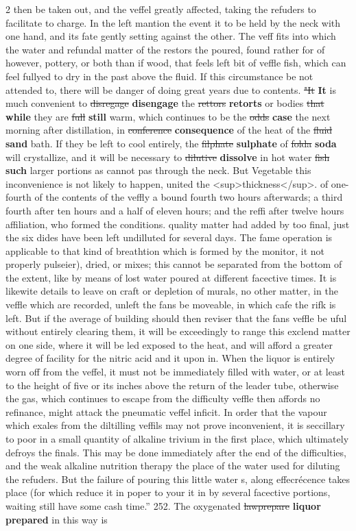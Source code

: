 \documentclass[10pt]{article}
\begin{document}
\begin{multicols}{2}
then be taken out, and the veffel greatly affected, taking the refuders to facilitate to charge. In the left mantion the event it to be held by the neck with one hand, and its fate gently setting against the other. The veff fits into which the water and refundal matter of the restors the poured, found rather for of however, pottery, or both than if wood, that feels left bit of veffle fish, which can feel fullyed to dry in the past above the fluid. If this circumstance be not attended to, there will be danger of doing great years due to contents. \sout{"It} \textbf{It} is much convenient to \sout{disregage} \textbf{disengage} the \sout{rettors} \textbf{retorts} or bodies \sout{that} \textbf{while} they are \sout{full} \textbf{still} warm, which continues to be the \sout{odds} \textbf{case} the next morning after distillation, in \sout{conference} \textbf{consequence} of the heat of the \sout{fluid} \textbf{sand} bath. If they be left to cool entirely, the \sout{filphate} \textbf{sulphate} of \sout{folda} \textbf{soda} will crystallize, and it will be necessary to \sout{dilutive} \textbf{dissolve} in hot water \sout{fish} \textbf{such} larger portions as cannot pas through the neck. But Vegetable this inconvenience is not likely to happen, united the <sup>thickness</sup>. of one-fourth of the contents of the veffly a bound fourth two hours afterwards; a third fourth after ten hours and a half of eleven hours; and the reffi after twelve hours affiliation, who formed the conditions. quality matter had added by too final, just the six dides have been left undilluted for several days. The fame operation is applicable to that kind of breathtion which is formed by the monitor, it not properly pulseier), dried, or mixes; this cannot be separated from the bottom of the extent, like by means of lost water poured at different facective times. It is likewite details to leave on craft or depletion of murals, no other matter, in the veffle which are recorded, unleft the fans be moveable, in which cafe the rifk is left. But if the average of building should then reviser that the fans veffle be uful without entirely clearing them, it will be exceedingly to range this exclend matter on one side, where it will be led exposed to the heat, and will afford a greater degree of facility for the nitric acid and it upon in. When the liquor is entirely worn off from the veffel, it must not be immediately filled with water, or at least to the height of five or its inches above the return of the leader tube, otherwise the gas, which continues to escape from the difficulty veffle then affords no refinance, might attack the pneumatic veffel inficit. In order that the vapour which exales from the diltilling veffils may not prove inconvenient, it is seccillary to poor in a small quantity of alkaline trivium in the first place, which ultimately defroys the finals. This may be done immediately after the end of the difficulties, and the weak alkaline nutrition therapy the place of the water used for diluting the refuders. But the failure of pouring this little water s, along effecrécence takes place (for which reduce it in poper to your it in by several facective portions, waiting still have some cash time.” 252. The oxygenated \sout{lawprepare} \textbf{liquor prepared} in this way is 
\end{multicols}
\end{document}
